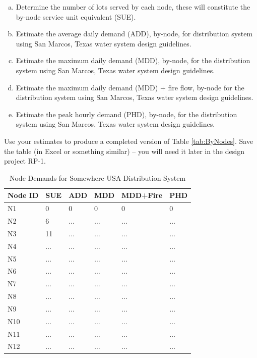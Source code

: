\documentclass[12pt]{article}
\begin{document}
\begin{enumerate}
\begin{enumerate}[a)]
\item Determine the number of lots served by each node, these will constitute the by-node service unit equivalent (SUE).
\item Estimate the average daily demand (ADD), by-node, for distribution system using San Marcos, Texas water system design guidelines.
\item Estimate the maximum daily demand (MDD), by-node, for the distribution system using San Marcos, Texas water system design guidelines.
\item Estimate the maximum daily demand (MDD) + fire flow, by-node for the distribution system using San Marcos, Texas water system design guidelines.
\item Estimate the peak hourly demand (PHD), by-node, for the distribution system using San Marcos, Texas water system design guidelines.
\end{enumerate}
Use your estimates to produce a completed version of Table \ref{tab:ByNodes}.
Save the table (in Excel or something similar) -- you will need it later in the design project RP-1.
\begin{table}[h!]
   \centering
   \caption{Node Demands for Somewhere USA Distribution System}
   \begin{tabular}{p{1in}p{1in}p{1in}p{1in}p{1in}p{1in}} %
Node ID & SUE & ADD & MDD & MDD+Fire & PHD \\
\hline
\hline
N1 & 0 & 0 & 0 & 0 & 0 \\
N2 & 6 & $\dots$& $\dots$&$\dots$& $\dots$ \\
N3 & 11 & $\dots$& $\dots$&$\dots$& $\dots$ \\
N4 & $\dots$ & $\dots$& $\dots$&$\dots$& $\dots$ \\
N5 & $\dots$ & $\dots$& $\dots$&$\dots$& $\dots$ \\
N6 & $\dots$ & $\dots$& $\dots$&$\dots$& $\dots$ \\
N7 & $\dots$ & $\dots$& $\dots$&$\dots$& $\dots$ \\
N8 & $\dots$ & $\dots$& $\dots$&$\dots$& $\dots$ \\
N9 & $\dots$ & $\dots$& $\dots$&$\dots$& $\dots$ \\
N10 & $\dots$ & $\dots$& $\dots$&$\dots$& $\dots$ \\
N11 & $\dots$ & $\dots$& $\dots$&$\dots$& $\dots$ \\
N12 & $\dots$ & $\dots$& $\dots$&$\dots$& $\dots$ \\

\end{tabular}
\end{table}
\end{enumerate}
\end{document}
